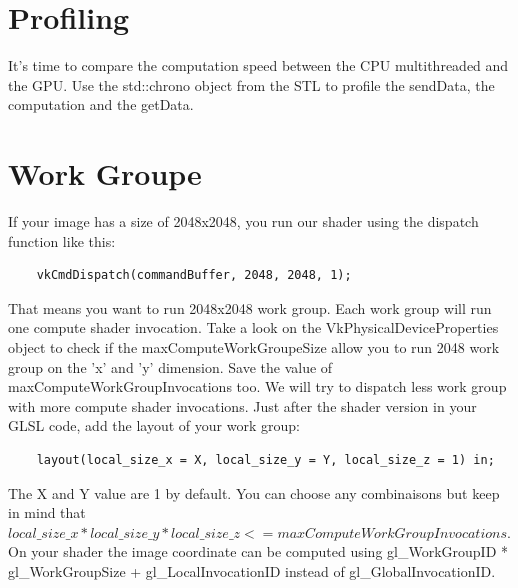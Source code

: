 \documentclass{article}
\begin{document}
\section{Profiling}
It's time to compare the computation speed between the CPU multithreaded and the GPU. Use the std::chrono object from the STL to profile the sendData, the computation and the getData.

\section{Work Groupe}
If your image has a size of 2048x2048, you run our shader using the dispatch function like this:
\begin{lstlisting}
	vkCmdDispatch(commandBuffer, 2048, 2048, 1);
\end{lstlisting}
That means you want to run 2048x2048 work group. Each work group will run one compute shader invocation. Take a look on the VkPhysicalDeviceProperties object to check if the maxComputeWorkGroupeSize allow you to run 2048 work group on the 'x' and 'y' dimension. Save the value of maxComputeWorkGroupInvocations too. We will try to dispatch less work group with more compute shader invocations. Just after the shader version in your GLSL code, add the layout of your work group:

\begin{lstlisting}
	layout(local_size_x = X, local_size_y = Y, local_size_z = 1) in;
\end{lstlisting}

The X and Y value are 1 by default. You can choose any combinaisons but keep in mind that $local\_size\_x * local\_size\_y * local\_size\_z <= maxComputeWorkGroupInvocations$. On your shader the image coordinate can be computed using gl\_WorkGroupID * gl\_WorkGroupSize + gl\_LocalInvocationID instead of gl\_GlobalInvocationID.
\end{document}
